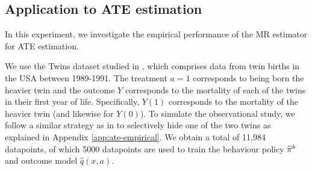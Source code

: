 


\subsection{Application to ATE estimation}\label{subsec:causal-experiments}
In this experiment, we investigate the empirical performance of the MR estimator for ATE estimation. 

We use the Twins dataset studied in \cite{louizos2017causal}, which comprises data from twin births in the USA between 1989-1991. The treatment $a=1$ corresponds to being born the heavier twin and the outcome $Y$ corresponds to the mortality of each of the twins in their first year of life. Specifically, $Y(1)$ corresponds to the mortality of the heavier twin (and likewise for $Y(0)$). To simulate the observational study, we follow a similar strategy as in \cite{louizos2017causal} to selectively hide one of the two twins as explained in Appendix \ref{app:ate-empirical}. We obtain a total of 11,984 datapoints, of which 5000 datapoints are used to train the behaviour policy $\widehat{\pi}^b$ and outcome model $\hat{q}(x, a)$.


